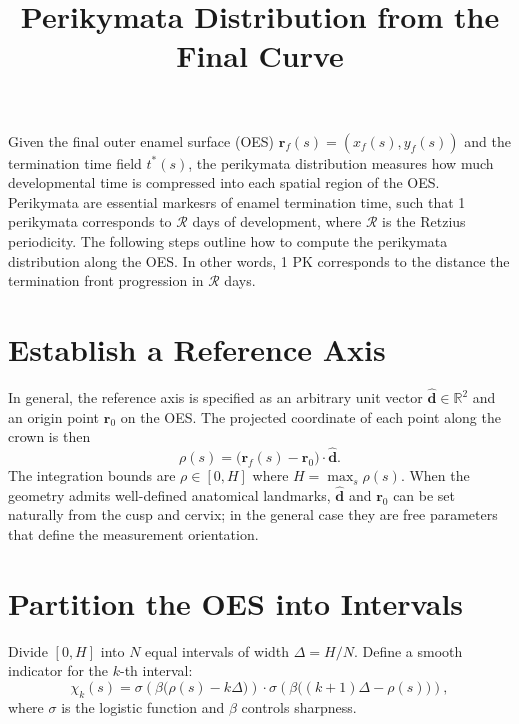 \documentclass[11pt]{article}
\title{Perikymata Distribution from the Final Curve}
\date{}
\begin{document}
\maketitle

Given the final outer enamel surface (OES) $\mathbf{r}_f(s) = (x_f(s), y_f(s))$ and the
termination time field $t^*(s)$, the perikymata distribution measures how much developmental
time is compressed into each spatial region of the OES. Perikymata are essential markesrs of enamel termination time, such that 1 perikymata corresponds to $\mathcal{R}$ days of development, where $\mathcal{R}$ is the Retzius periodicity. The following steps outline how to compute the perikymata distribution along the OES. In other words, 1 PK corresponds to the distance the termination front progression in $\mathcal{R}$ days.

\section{Establish a Reference Axis}

In general, the reference axis is specified as an arbitrary unit vector
$\hat{\mathbf{d}} \in \mathbb{R}^2$ and an origin point $\mathbf{r}_0$ on the OES.
The projected coordinate of each point along the crown is then
\begin{equation}
    \rho(s) = \bigl(\mathbf{r}_f(s) - \mathbf{r}_0\bigr) \cdot \hat{\mathbf{d}}.
\end{equation}
The integration bounds are $\rho \in [0, H]$ where $H = \max_s \rho(s)$. When the geometry
admits well-defined anatomical landmarks, $\hat{\mathbf{d}}$ and $\mathbf{r}_0$ can be set
naturally from the cusp and cervix; in the general case they are free parameters that define
the measurement orientation.

\section{Partition the OES into Intervals}

Divide $[0, H]$ into $N$ equal intervals of width $\Delta = H/N$. Define a smooth indicator
for the $k$-th interval:
\begin{equation}
    \chi_k(s)
    =
    \sigma\!\left(\beta\bigl(\rho(s) - k\Delta\bigr)\right)
    \cdot
    \sigma\!\left(\beta\bigl((k+1)\Delta - \rho(s)\bigr)\right),
\end{equation}
where $\sigma$ is the logistic function and $\beta$ controls sharpness.
\end{document}
